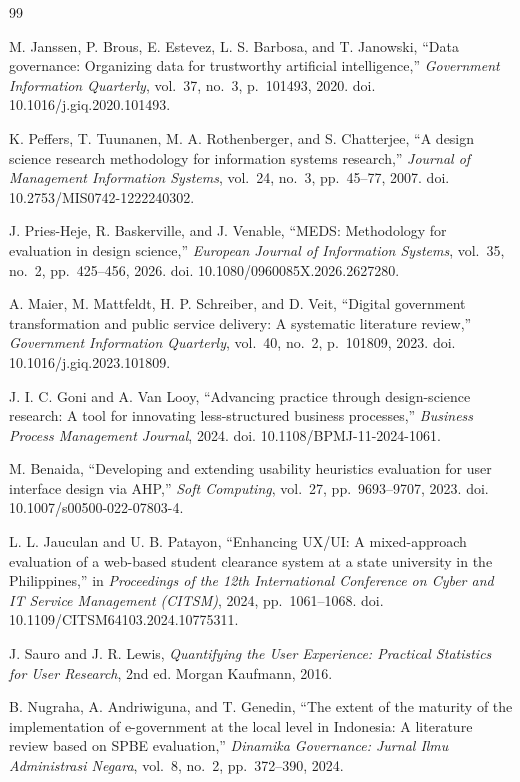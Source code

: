 \documentclass[conference,a4paper]{IEEEtran}
\begin{document}
\begin{thebibliography}{99}

 M. Janssen, P. Brous, E. Estevez, L. S. Barbosa, and T. Janowski, ``Data governance: Organizing data for trustworthy artificial intelligence,'' \emph{Government Information Quarterly}, vol.~37, no.~3, p.~101493, 2020. doi. 10.1016/j.giq.2020.101493.

 K. Peffers, T. Tuunanen, M. A. Rothenberger, and S. Chatterjee, ``A design science research methodology for information systems research,'' \emph{Journal of Management Information Systems}, vol.~24, no.~3, pp.~45--77, 2007. doi. 10.2753/MIS0742-1222240302.

 J. Pries-Heje, R. Baskerville, and J. Venable, ``MEDS: Methodology for evaluation in design science,'' \emph{European Journal of Information Systems}, vol.~35, no.~2, pp.~425--456, 2026. doi. 10.1080/0960085X.2026.2627280.

 A. Maier, M. Mattfeldt, H. P. Schreiber, and D. Veit, ``Digital government transformation and public service delivery: A systematic literature review,'' \emph{Government Information Quarterly}, vol.~40, no.~2, p.~101809, 2023. doi. 10.1016/j.giq.2023.101809.

 J. I. C. Goni and A. Van Looy, ``Advancing practice through design-science research: A tool for innovating less-structured business processes,'' \emph{Business Process Management Journal}, 2024. doi. 10.1108/BPMJ-11-2024-1061.

 M. Benaida, ``Developing and extending usability heuristics evaluation for user interface design via AHP,'' \emph{Soft Computing}, vol.~27, pp.~9693--9707, 2023. doi. 10.1007/s00500-022-07803-4.

 L. L. Jauculan and U. B. Patayon, ``Enhancing UX/UI: A mixed-approach evaluation of a web-based student clearance system at a state university in the Philippines,'' in \emph{Proceedings of the 12th International Conference on Cyber and IT Service Management (CITSM)}, 2024, pp.~1061--1068. doi. 10.1109/CITSM64103.2024.10775311.

 J. Sauro and J. R. Lewis, \emph{Quantifying the User Experience: Practical Statistics for User Research}, 2nd ed. Morgan Kaufmann, 2016.

 B. Nugraha, A. Andriwiguna, and T. Genedin, ``The extent of the maturity of the implementation of e-government at the local level in Indonesia: A literature review based on SPBE evaluation,'' \emph{Dinamika Governance: Jurnal Ilmu Administrasi Negara}, vol.~8, no.~2, pp.~372--390, 2024.


\end{thebibliography}
\end{document}
